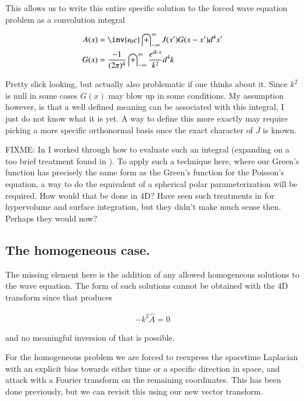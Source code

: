 \documentclass{article}
\newcommand{\IIinf}[0]{ \int_{-\infty}^\infty }
\begin{document}
This allows us to write this entire specific solution to the forced wave equation problem as a convolution integral

\begin{align}\label{eqn:potentialInHomogeneous}
A(x) &= \inv{\epsilon_0 c} \IIinf {J}(x') G(x-x') d^4 x' \\
G(x) &= \frac{-1}{ ({2\pi})^4} \IIinf \frac{e^{ i k \cdot x }}{ k^2 } d^4 k 
\end{align}

Pretty slick looking, but actually also problematic if one thinks about it.  Since $k^2$ is null in some cases
$G(x)$ may blow up in some conditions.  My assumption however, is that a well defined meaning can be associated
with this integral, I just do not know what it is yet.  A way to define this more exactly may require
picking a more specific orthonormal basis once the exact character of $J$ is known.

FIXME: In \cite{PJpoisson} I worked through how to evaluate such an integral
(expanding on a too brief treatment found in \cite{byron1992mca}).
To apply such a technique here, where our Green's function has precisely
the same form
as the Green's function for the Poisson's equation, a way to do the
equivalent of a spherical polar parameterization will be required.
How would that be done in 4D?  Have seen such treatments in 
\cite{flanders1989dfa} for hypervolume and surface integration, but they
didn't make much sense then.  Perhaps they would now?

\subsection{ The homogeneous case. }

The missing element here is the addition of any allowed homogeneous solutions to the wave equation.
The form of such solutions cannot be obtained with the 4D transform since that produces

\begin{align*}
-k^2 \hat{A} = 0
\end{align*}

and no meaningful inversion of that is possible.

For the homogeneous problem we are forced to reexpress the spacetime Laplacian with an explicit bias towards either time or a specific direction in space, and attack with a Fourier transform on the remaining coordinates.  This has been done previously, but we can
revisit this using our new vector transform.
\end{document}
